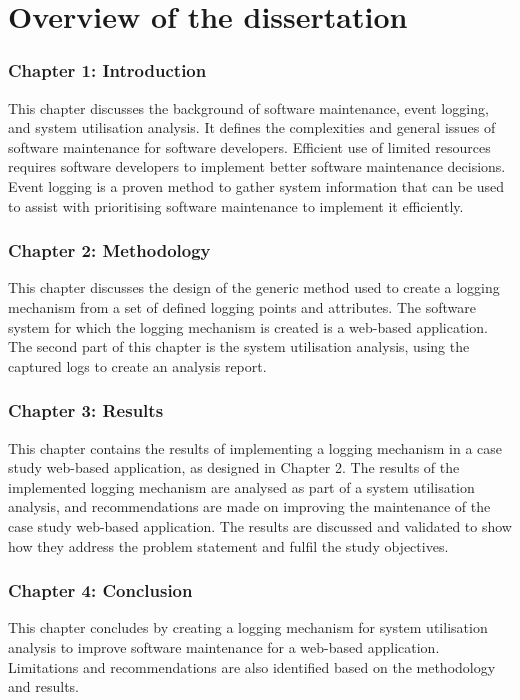\clearpage

\section{Overview of the dissertation}
\subsubsection{Chapter 1: Introduction}
This chapter discusses the background of software maintenance, event logging, and system utilisation analysis. It defines the complexities and general issues of software maintenance for software developers. Efficient use of limited resources requires software developers to implement better software maintenance decisions. Event logging is a proven method to gather system information that can be used to assist with prioritising software maintenance to implement it efficiently.

\subsubsection{Chapter 2: Methodology}
This chapter discusses the design of the generic method used to create a logging mechanism from a set of defined logging points and attributes. The software system for which the logging mechanism is created is a web-based application. The second part of this chapter is the system utilisation analysis, using the captured logs to create an analysis report.

\subsubsection{Chapter 3: Results}
This chapter contains the results of implementing a logging mechanism in a case study web-based application, as designed in Chapter 2. The results of the implemented logging mechanism are analysed as part of a system utilisation analysis, and recommendations are made on improving the maintenance of the case study web-based application. The results are discussed and validated to show how they address the problem statement and fulfil the study objectives.

\subsubsection{Chapter 4: Conclusion}
This chapter concludes by creating a logging mechanism for system utilisation analysis to improve software maintenance for a web-based application. Limitations and recommendations are also identified based on the methodology and results.
